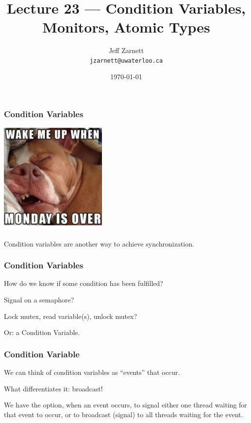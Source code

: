 

\title{Lecture 23 --- Condition Variables, Monitors, Atomic Types }

\author{Jeff Zarnett \\ \small \texttt{jzarnett@uwaterloo.ca}}
\date{\today}




\begin{frame}
  \titlepage

 \end{frame}


\begin{frame}
\frametitle{Condition Variables}

\begin{center}
	\includegraphics[width=0.4\textwidth]{images/monday.png}
\end{center}

Condition variables are another way to achieve synchronization.

\end{frame}

\begin{frame}
\frametitle{Condition Variables}

How do we know if some condition has been fulfilled?

Signal on a semaphore?

Lock mutex, read variable(s), unlock mutex?

Or: a Condition Variable.

\end{frame}


\begin{frame}
\frametitle{Condition Variable}

We can think of condition variables as ``events'' that occur.

What differentiates it: broadcast!

We have the option, when an event occurs, to signal either one thread waiting for that event to occur, or to broadcast (signal) to all threads waiting for the event.

\end{frame}

